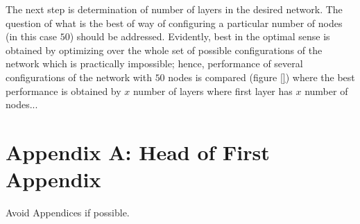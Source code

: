 \documentclass[twocolumn,10pt]{asme2e}
\begin{document}
The next step is determination of number of layers in the desired network. The question of what is the best of way of configuring a particular number of nodes (in this case $50$) should be addressed. Evidently, best in the optimal sense is obtained by optimizing over the whole set of possible configurations of the network which is practically impossible; hence, performance of several configurations of the network with $50$ nodes is compared (figure \ref{}) where the best performance is obtained by $x$ number of layers where first layer has $x$ number of nodes...

 





\appendix       %
\section*{Appendix A: Head of First Appendix}
Avoid Appendices if possible.
\end{document}
